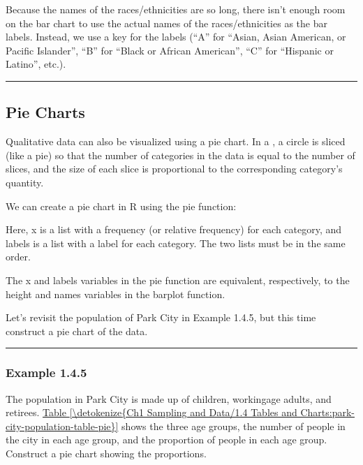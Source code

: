\documentclass[letterpaper,10pt,english]{jupyterBook}
\begin{document}
\sphinxAtStartPar
Because the names of the races/ethnicities are so long, there isn’t enough room on the bar chart to use the actual names of the races/ethnicities as the bar labels. Instead, we use a key for the labels (“A” for “Asian, Asian American, or Pacific Islander”, “B” for “Black or African American”, “C” for “Hispanic or Latino”, etc.).


\bigskip\hrule\bigskip



\subsection{Pie Charts}
\label{\detokenize{Ch1 Sampling and Data/1.4 Tables and Charts:pie-charts}}
\sphinxAtStartPar
Qualitative data can also be visualized using a pie chart. In a , a circle is sliced (like a pie) so that the number of categories in the data is equal to the number of slices, and the size of each slice is proportional to the corresponding category’s quantity.

\sphinxAtStartPar
We can create a pie chart in R using the pie function:

\begin{sphinxVerbatim}[commandchars=\\\{\}]
\end{sphinxVerbatim}

\sphinxAtStartPar
Here, x is a list with a frequency (or relative frequency) for each category, and labels is a list with a label for each category. The two lists must be in the same order.

\sphinxAtStartPar
The x and labels variables in the pie function are equivalent, respectively, to the height and names variables in the barplot function.

\sphinxAtStartPar
Let’s revisit the population of Park City in Example 1.4.5, but this time construct a pie chart of the data.


\bigskip\hrule\bigskip



\subsubsection{Example 1.4.5}
\label{\detokenize{Ch1 Sampling and Data/1.4 Tables and Charts:example-1-4-5}}
\sphinxAtStartPar
The population in Park City is made up of children, working\sphinxhyphen{}age adults, and retirees. \hyperref[\detokenize{Ch1 Sampling and Data/1.4 Tables and Charts:park-city-population-table-pie}]{Table \ref{\detokenize{Ch1 Sampling and Data/1.4 Tables and Charts:park-city-population-table-pie}}} shows the three age groups, the number of people in the city in each age group, and the proportion of people in each age group. Construct a pie chart showing the proportions.
\end{document}
